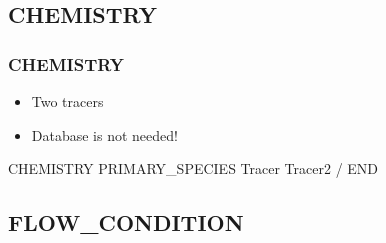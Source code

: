 \documentclass{beamer}
\begin{document}
\subsection{CHEMISTRY}

\begin{frame}\frametitle{CHEMISTRY}

\begin{itemize}
\item Two tracers
\item Database is not needed!
\end{itemize}

\begin{semiverbatim}
CHEMISTRY
  PRIMARY_SPECIES
    Tracer
    Tracer2
  /
END
\end{semiverbatim}

\end{frame}

\subsection{FLOW\_CONDITION}
\end{document}
